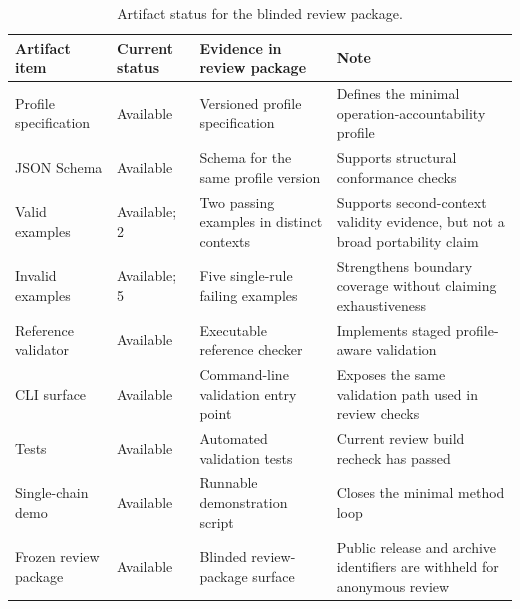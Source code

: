 \begin{table}[t]
\centering
\scriptsize
\setlength{\tabcolsep}{3pt}
\renewcommand{\arraystretch}{1.15}
\caption{Artifact status for the blinded review package.}
\label{tab:artifact-status}
\begin{tabularx}{\linewidth}{P{1.8cm}P{1.55cm}YY}
\toprule
Artifact item & Current status & Evidence in review package & Note \\
\midrule
Profile specification &
Available &
Versioned profile specification &
Defines the minimal operation-accountability profile \\
JSON Schema &
Available &
Schema for the same profile version &
Supports structural conformance checks \\
Valid examples &
Available; 2 &
Two passing examples in distinct contexts &
Supports second-context validity evidence, but not a broad portability claim \\
Invalid examples &
Available; 5 &
Five single-rule failing examples &
Strengthens boundary coverage without claiming exhaustiveness \\
Reference validator &
Available &
Executable reference checker &
Implements staged profile-aware validation \\
CLI surface &
Available &
Command-line validation entry point &
Exposes the same validation path used in review checks \\
Tests &
Available &
Automated validation tests &
Current review build recheck has passed \\
Single-chain demo &
Available &
Runnable demonstration script &
Closes the minimal method loop \\
Frozen review package &
Available &
Blinded review-package surface &
Public release and archive identifiers are withheld for anonymous review \\
\bottomrule
\end{tabularx}
\end{table}

